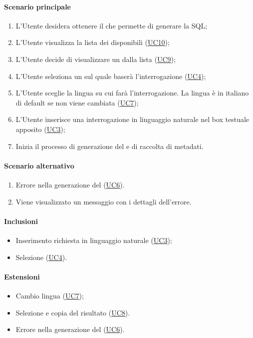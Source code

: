 \paragraph*{Scenario principale}
\begin{enumerate}
  \item L’Utente desidera ottenere il  che permette di generare la  SQL;
  \item L'Utente visualizza la lista dei  disponibili (\hyperref[UC10]{UC10});
  \item L'Utente decide di visualizzare un  dalla lista (\hyperref[UC9]{UC9});
  \item L’Utente seleziona un  sul quale baserà l’interrogazione (\hyperref[UC4]{UC4});
  \item L’Utente sceglie la lingua su cui farà l’interrogazione. La lingua è in italiano di default se non viene cambiata (\hyperref[UC7]{UC7});
  \item L’Utente inserisce una interrogazione in linguaggio naturale nel box testuale apposito (\hyperref[UC3]{UC3});
  \item Inizia il processo di generazione del  e di raccolta di metadati.
\end{enumerate}

\paragraph*{Scenario alternativo}
\begin{enumerate}
  \item Errore nella generazione del  (\hyperref[UC6]{UC6}).
  \item Viene visualizzato un messaggio con i dettagli dell'errore.
\end{enumerate}

\paragraph*{Inclusioni}
\begin{itemize}
  \item Inserimento richiesta in linguaggio naturale (\hyperref[UC3]{UC3});
  \item Selezione  (\hyperref[UC4]{UC4}).
\end{itemize}

\paragraph*{Estensioni}
\begin{itemize}
  \item Cambio lingua (\hyperref[UC7]{UC7});
  \item Selezione e copia del  risultato (\hyperref[UC8]{UC8}).
  \item Errore nella generazione del  (\hyperref[UC6]{UC6}).
\end{itemize}
